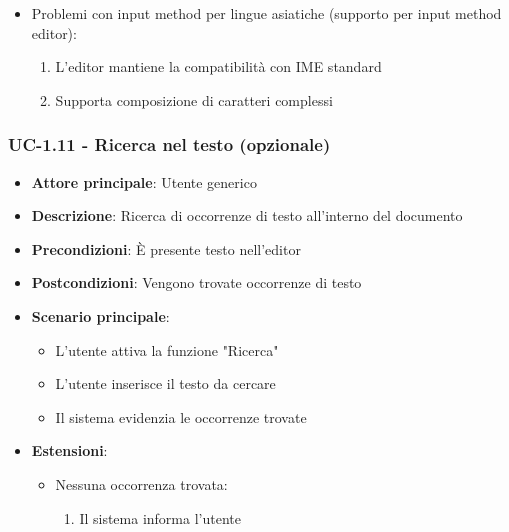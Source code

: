 \documentclass[11pt,a4paper]{article}
\begin{document}
\begin{itemize}
\begin{itemize}
                \begin{enumerate}
                    \item L'editor usa automaticamente un font di fallback
                    \item Mostra un avviso suggerendo di installare font appropriati
                \end{enumerate}
            \item Problemi con input method per lingue asiatiche (supporto per input method editor):
                \begin{enumerate}
                    \item L'editor mantiene la compatibilità con IME standard
                    \item Supporta composizione di caratteri complessi
                \end{enumerate}
        \end{itemize}
\end{itemize}


\subsubsection{UC-1.11 - Ricerca nel testo (opzionale)}
\begin{itemize}
    \item \textbf{Attore principale}: Utente generico
    \item \textbf{Descrizione}: Ricerca di occorrenze di testo all'interno del documento
    \item \textbf{Precondizioni}: È presente testo nell'editor
    \item \textbf{Postcondizioni}: Vengono trovate occorrenze di testo
    \item \textbf{Scenario principale}:
        \begin{itemize}
            \item L'utente attiva la funzione "Ricerca"
            \item L'utente inserisce il testo da cercare
            \item Il sistema evidenzia le occorrenze trovate
        \end{itemize}
    \item \textbf{Estensioni}:
        \begin{itemize}
            \item Nessuna occorrenza trovata:
                \begin{enumerate}
                    \item Il sistema informa l'utente
                \end{enumerate}
        \end{itemize}
\end{itemize}
\end{document}
